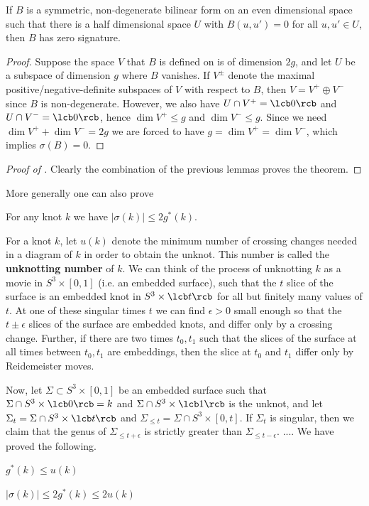 \begin{lem}
If $B$ is a symmetric, non-degenerate bilinear form on an even dimensional space such that there is a half dimensional space $U$ with $B(u,u')=0$ for all $u,u' \in U$, then $B$ has zero signature.
\end{lem}
\begin{proof}
Suppose the space $V$ that $B$ is defined on is of dimension $2g$, and let $U$ be a subspace of dimension $g$ where $B$ vanishes. If $V^\pm$ denote the maximal positive/negative-definite subspaces of $V$ with respect to $B$, then $V = V^+ \oplus V^-$ since $B$ is non-degenerate. However, we also have $U \cap V^+ = \lcb 0 \rcb$ and $U \cap V^- = \lcb 0 \rcb$, hence $\dim V^+ \leq g$ and $\dim V^- \leq g$. Since we need $\dim V^+ + \dim V^- = 2g$ we are forced to have $g = \dim V^+ = \dim V^-$, which implies $\sigma(B)=0$.
\end{proof}


\begin{proof}[Proof of ]
Clearly the combination of the previous lemmas proves the theorem.
\end{proof}

More generally one can also prove
\begin{thm}
\label{signature 4-ball genus bound}
For any knot $k$ we have $|\sigma(k)| \leq 2g^*(k)$.
\end{thm}

For a knot $k$, let $u(k)$ denote the minimum number of crossing changes needed in a diagram of $k$ in order to obtain the unknot. This number is called the \textbf{unknotting number} of $k$. We can think of the process of unknotting $k$ as a movie in $S^3 \times [0,1]$ (i.e. an embedded surface), such that the $t$ slice of the surface is an embedded knot in $S^3 \times \lcb t \rcb$ for all but finitely many values of $t$. At one of these singular times $t$ we can find $\epsilon > 0$ small enough so that the $t \pm \epsilon$ slices of the surface are embedded knots, and differ only by a crossing change. Further, if there are two times $t_0,t_1$ such that the slices of the surface at all times between $t_0,t_1$ are embeddings, then the slice at $t_0$ and $t_1$ differ only by Reidemeister moves. 

Now, let $\Sigma \subset S^3 \times [0,1]$ be an embedded surface such that $\Sigma \cap S^3 \times \lcb 0 \rcb = k$ and $\Sigma \cap S^3 \times \lcb 1 \rcb$ is the unknot, and let $\Sigma_t = \Sigma \cap S^3 \times \lcb t \rcb$ and $\Sigma_{\leq t} = \Sigma \cap S^3 \times [0,t]$. If $\Sigma_t$ is singular, then we claim that the genus of $\Sigma_{\leq t+\epsilon}$ is strictly greater than $\Sigma_{\leq t-\epsilon}$. \unfinished .... We have proved the following.
\begin{lem}
$g^*(k) \leq u(k)$
\end{lem}
\begin{cor}
$|\sigma(k)| \leq 2g^*(k) \leq 2u(k)$
\end{cor}


